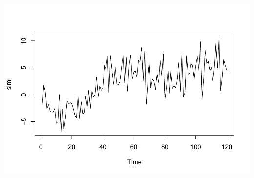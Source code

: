 \documentclass[]{article}
\begin{document}
\includegraphics{simulation_test_files/figure-latex/simulate-1.pdf}
\end{document}
